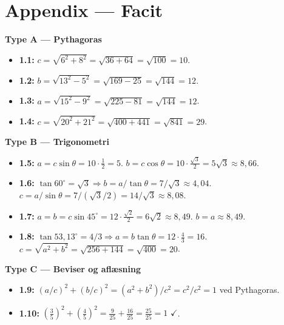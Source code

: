 \clearpage
\section*{Appendix --- Facit}

\noindent
\textbf{Type A --- Pythagoras}
\begin{itemize}[leftmargin=2em, itemsep=4pt]
  \item \textbf{1.1:} $c=\sqrt{6^{2}+8^{2}}=\sqrt{36+64}=\sqrt{100}=10$.
  \item \textbf{1.2:} $b=\sqrt{13^{2}-5^{2}}=\sqrt{169-25}=\sqrt{144}=12$.
  \item \textbf{1.3:} $a=\sqrt{15^{2}-9^{2}}=\sqrt{225-81}=\sqrt{144}=12$.
  \item \textbf{1.4:} $c=\sqrt{20^{2}+21^{2}}=\sqrt{400+441}=\sqrt{841}=29$.
\end{itemize}

\noindent
\textbf{Type B --- Trigonometri}
\begin{itemize}[leftmargin=2em, itemsep=4pt]
  \item \textbf{1.5:} $a=c\sin\theta=10\cdot\tfrac{1}{2}=5$. \quad
        $b=c\cos\theta=10\cdot\tfrac{\sqrt{3}}{2}=5\sqrt{3}\approx 8{,}66$.
  \item \textbf{1.6:} $\tan60^{\circ}=\sqrt{3}\Rightarrow b=a/\tan\theta=7/\sqrt{3}\approx 4{,}04$. \quad
        $c=a/\sin\theta=7/(\sqrt{3}/2)=14/\sqrt{3}\approx 8{,}08$.
  \item \textbf{1.7:} $a=b=c\sin45^{\circ}=12\cdot\tfrac{\sqrt{2}}{2}=6\sqrt{2}\approx 8{,}49$. \quad
        $b=a\approx 8{,}49$.
  \item \textbf{1.8:} $\tan53{,}13^{\circ}=4/3\Rightarrow a=b\tan\theta=12\cdot\tfrac{4}{3}=16$. \quad
        $c=\sqrt{a^{2}+b^{2}}=\sqrt{256+144}=\sqrt{400}=20$.
\end{itemize}

\noindent
\textbf{Type C --- Beviser og aflæsning}
\begin{itemize}[leftmargin=2em, itemsep=4pt]
  \item \textbf{1.9:} $(a/c)^{2}+(b/c)^{2}=(a^{2}+b^{2})/c^{2}=c^{2}/c^{2}=1$ ved Pythagoras.
  \item \textbf{1.10:} $(\tfrac{3}{5})^{2}+(\tfrac{4}{5})^{2}=\tfrac{9}{25}+\tfrac{16}{25}=\tfrac{25}{25}=1$ $\checkmark$.
\end{itemize}
